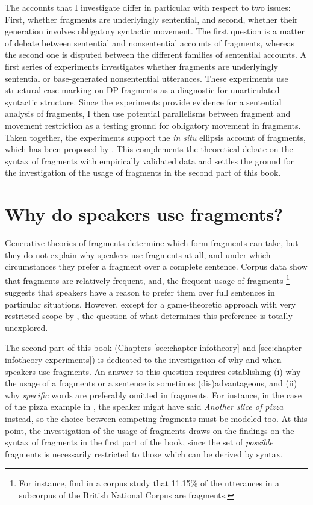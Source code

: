 The accounts that I investigate differ in particular with respect to two issues: First, whether fragments are underlyingly sentential, and second, whether their generation involves obligatory syntactic movement. The first question is a matter of debate between sentential and nonsentential accounts of fragments, whereas the second one is disputed between the different families of sentential accounts. A first series of experiments investigates whether fragments are underlyingly sentential or base-generated nonsentential utterances. These experiments use structural case marking on DP fragments as a diagnostic for unarticulated syntactic structure. Since the experiments provide evidence for a sentential analysis of fragments, I then use potential parallelisms between fragment and movement restriction as a testing ground for obligatory movement in fragments. Taken together, the experiments support the \textit{in situ} ellipsis account of fragments, which has been proposed by \citet{reich2007}. This complements the theoretical debate on the syntax of fragments with empirically validated data and settles the ground for the investigation of the usage of fragments in the second part of this book.

\section{Why do speakers use fragments?}
Generative theories of fragments determine which form fragments can take, but they do not explain why speakers use fragments at all, and under which circumstances they prefer a fragment over a complete sentence. Corpus data show that fragments are relatively frequent, and, the frequent usage of fragments%
%
\footnote{For instance, \citet{fernandez.ginzburg2002} find in a corpus study that 11.15\% of the utterances in a subcorpus of the British National Corpus \citep{burnard2000} are fragments.}\afterfn%
%
suggests that speakers have a reason to prefer them over full sentences in particular situations. However, except for a game-theoretic approach with very restricted scope by \citet{bergen.goodman2015}, the question of what determines this preference is totally unexplored.

The second part of this book (Chapters \ref{sec:chapter-infotheory} and \ref{sec:chapter-infotheory-experiments}) is dedicated to the investigation of why and when speakers use fragments. An answer to this question requires establishing (i) why the usage of a fragments or a sentence is sometimes (dis)advantageous, and (ii) why \textit{specific} words are preferably omitted in fragments. For instance, in the case of the pizza example in \Last, the speaker might have said \textit{Another slice of pizza} instead, so the choice between competing fragments must be modeled too. At this point, the investigation of the usage of fragments draws on the findings on the syntax of fragments in the first part of the book, since the set of \textit{possible} fragments is necessarily restricted to those which can be derived by syntax. 


